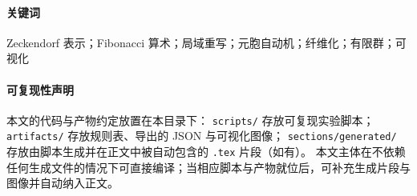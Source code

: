 
\begin{abstract}
本文在 Zeckendorf 表示的框架下构造一个可计算、可复现、可视化的“折叠/展开”核，并以 $m=6$ 截断为最小闭合实例给出完整实现。
我们将微态空间取为 $\M_6\simeq\{0,\dots,63\}$（共 $64$ 个状态），以 Zeckendorf 正规形的低位投影得到 $21$ 个稳定空间态 $\X_6$，
并将高位残余解释为时间纤维 $u\in\{0,21,34,55\}$，从而形成一个有限纤维化 $\M_6\to\X_6$。
我们证明纤维大小仅可能为 $2,3,4$，且由空间态的低位值 $V(w)$ 完全决定。

进一步，我们定义仅由两种原语组成的闭合运算：展开为逐位叠加，折叠为基于斐波那契恒等式的局域重写归一化并附加一次模 $64$ 回卷；
该运算在微观上同构于循环群 $(\ZZ_{64},+)$。
在实现层面，我们给出一个半径 $r=2$、相位周期 $P=90$ 的局域重写元胞自动机（CA），对所有 $64^2$ 输入对穷举验证其输出恒等于 $(a+b)\bmod 64$。
最后，我们构造一个以微态为格点值的 $1$D 环形 CA，并给出微态层、空间态层与纤维层三种时空图可视化，展示“观测投影导致的多值/分叉”在最小闭合系统中的具体形态。
\end{abstract}

\paragraph{关键词}
Zeckendorf 表示；Fibonacci 算术；局域重写；元胞自动机；纤维化；有限群；可视化

\paragraph{可复现性声明}
本文的代码与产物约定放置在本目录下：
\verb|scripts/| 存放可复现实验脚本；
\verb|artifacts/| 存放规则表、导出的 JSON 与可视化图像；
\verb|sections/generated/| 存放由脚本生成并在正文中被自动包含的 \verb|.tex| 片段（如有）。
本文主体在不依赖任何生成文件的情况下可直接编译；当相应脚本与产物就位后，可补充生成片段与图像并自动纳入正文。

